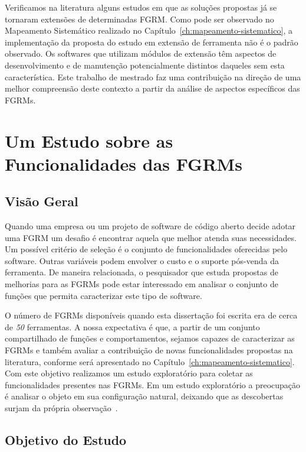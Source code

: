 Verificamos na literatura alguns estudos em que as soluções propostas já se
tornaram extensões de determinadas FGRM\@. Como pode ser observado no Mapeamento
Sistemático realizado no Capítulo~\ref{ch:mapeamento-sistematico}, a
implementação da proposta do estudo em extensão de ferramenta não é o padrão
observado. Os softwares que utilizam módulos de extensão têm aspectos de
desenvolvimento e de manutenção potencialmente distintos daqueles sem esta
característica. Este trabalho de mestrado faz uma contribuição na direção de uma
melhor compreensão deste contexto a partir da análise de aspectos específicos
das FGRMs.

\section{Um Estudo sobre as Funcionalidades das FGRMs}\label{sec:caracterizacao_ferramentas}

\subsection{Visão Geral}\label{subsec:caracterizacao_intro}

Quando uma empresa ou um projeto de software de código aberto decide adotar uma
FGRM um desafio é encontrar aquela que melhor atenda suas necessidades. Um
possível critério de seleção é o conjunto de funcionalidades oferecidas pelo
software. Outras variáveis podem envolver o custo e o suporte pós-venda da
ferramenta. De maneira relacionada, o pesquisador que estuda propostas de
melhorias para as FGRMs pode estar interessado em analisar o conjunto de funções
que permita caracterizar este tipo de software.

O número de FGRMs disponíveis quando esta dissertação foi escrita era de cerca
de \textit{50} ferramentas. A nossa expectativa é que, a partir de um conjunto
compartilhado de funções e comportamentos, sejamos capazes de caracterizar as
FGRMs e também avaliar a contribuição de novas funcionalidades propostas na
li\-te\-ra\-tu\-ra, conforme será apresentado no
Capítulo~\ref{ch:mapeamento-sistematico}. Com este objetivo realizamos um
estudo exploratório para coletar as funcionalidades presentes nas FGRMs. Em um
estudo exploratório a preocupação é analisar o objeto em sua configuração
natural, deixando que as descobertas surjam da própria
observação~\cite{wohlin2012experimentation}.

\subsection{Objetivo do Estudo}\label{subsec:caracterizacao_objetivo_do_capitulo}

